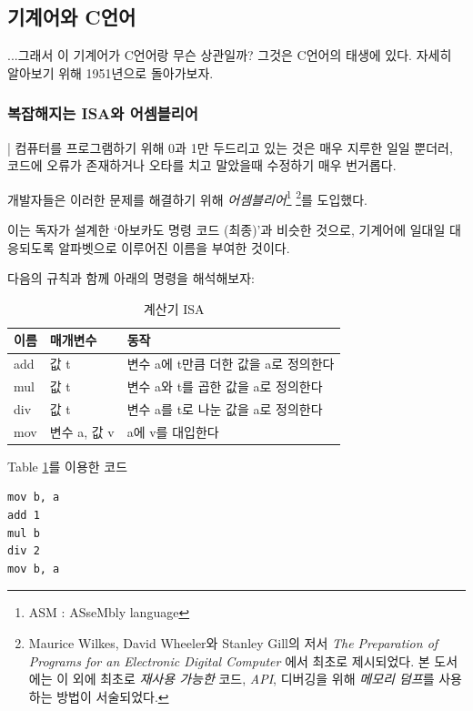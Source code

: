 \documentclass{article}
\begin{document}
\subsection{기계어와 C언어}

...그래서 이 기계어가 C언어랑 무슨 상관일까?
그것은 C언어의 태생에 있다.
자세히 알아보기 위해 1951년으로 돌아가보자.

\subsubsection{복잡해지는 ISA와 어셈블리어}

| 컴퓨터를 프로그램하기 위해 0과 1만 두드리고 있는 것은
매우 지루한 일일 뿐더러, 코드에 오류가 존재하거나 오타를 치고 말았을때
수정하기 매우 번거롭다.

개발자들은 이러한 문제를 해결하기 위해
\textit{어셈블리어}\footnote{ASM : ASseMbly language}
\footnote{
    Maurice Wilkes, David Wheeler와 Stanley Gill의 저서
    \textit{The Preparation of Programs for an Electronic Digital Computer}
    에서 최초로 제시되었다.
    본 도서에는 이 외에 최초로 \textit{재사용 가능한} 코드, \textit{API},
    디버깅을 위해 \textit{메모리 덤프}를 사용하는 방법이 서술되었다.
}를 도입했다. 

이는 독자가 설계한 `아보카도 명령 코드 (최종)'과 비슷한 것으로,
기계어에 일대일 대응되도록 알파벳으로 이루어진 이름을 부여한 것이다.

다음의 규칙과 함께 아래의 명령을 해석해보자:

\begin{table}[!h]
    \centering

    \caption{계산기 ISA}
    \label{Tab:simple-calculator-isa}

    \begin{tabular}{ || m{2em} | m{5em} | m{22em} || }
        \hline
        이름 & 매개변수 & 동작 \\
        \hline\hline
        add  & 값 t & 변수 a에 t만큼 더한 값을 a로 정의한다 \\
        \hline
        mul  & 값 t & 변수 a와 t를 곱한 값을 a로 정의한다 \\
        \hline
        div  & 값 t & 변수 a를 t로 나눈 값을 a로 정의한다 \\
        \hline
        mov  & 변수 a, 값 v & a에 v를 대입한다 \\
        \hline
    \end{tabular}
\end{table}

\begin{center}

    \centering
    
    Table \ref{Tab:simple-calculator-isa}를 이용한 코드

\begin{lstlisting}[escapeinside=``]
mov b, a
add 1
mul b
div 2
mov b, a
\end{lstlisting}
\end{center}
\end{document}
